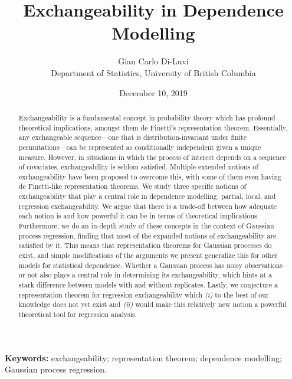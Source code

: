 \documentclass[10pt]{article}
\title{Exchangeability in Dependence Modelling} %
\author{Gian Carlo Di-Luvi 
\\
{\normalsize Department of Statistics, University of British Columbia}} %
\date{\normalsize December 10, 2019} %
\begin{document}
\maketitle
\thispagestyle{empty}

\vskip 0.75cm

\begin{abstract}
\noindent Exchangeability is a fundamental concept in probability theory which has profound theoretical implications, amongst them de Finetti's representation theorem. Essentially, any exchangeable sequence---one that is distribution-invariant under finite permutations---can be represented as conditionally independent given a unique measure. However, in situations in which the process of interest depends on a sequence of covariates, exchangeability is seldom satisfied. Multiple extended notions of exchangeability have been proposed to overcome this, with some of them even having de Finetti-like representation theorems. We study three specific notions of exchangeability that play a central role in dependence modelling: partial, local, and regression exchangeability. We argue that there is a trade-off between how adequate each notion is and how powerful it can be in terms of theoretical implications. Furthermore, we do an in-depth study of these concepts in the context of Gaussian process regression, finding that most of the expanded notions of exchangeability are satisfied by it. This means that representation theorems for Gaussian processes do exist, and simple modifications of the arguments we present generalize this for other models for statistical dependence. Whether a Gaussian process has noisy observations or not also plays a central role in determining its exchangeability, which hints at a stark difference between models with and without replicates. Lastly, we conjecture a representation theorem for regression exchangeability which \textit{(i)} to the best of our knowledge does not yet exist and \textit{(ii)} would make this relatively new notion a powerful theoretical tool for regression analysis.
\end{abstract}

\textbf{Keywords:} exchangeability; representation theorem; dependence modelling; Gaussian process regression.




\cleardoublepage
\setcounter{page}{1}


\vskip 2cm

\end{document}
